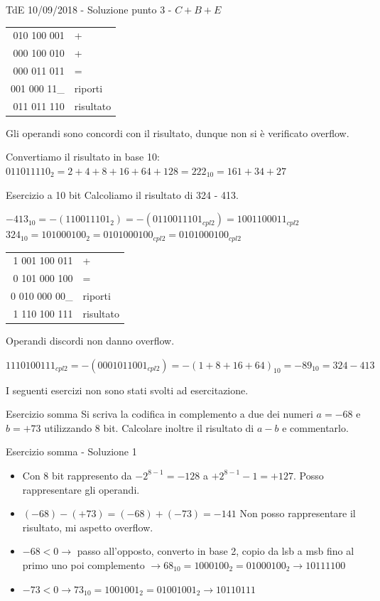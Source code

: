 \documentclass[aspectratio=169, ]{beamer}
\begin{document}
\begin{frame}{TdE 10/09/2018 - Soluzione punto 3 - $C+B+E$}
\begin{tabular}{r|l}
	010 100 001 & + \\
	000 100 010 & + \\
	000 011 011 &	=	\\
	\hline
	001 000 11\_&	riporti\\
	011 011 110	& risultato
\end{tabular}

\pause
Gli operandi sono concordi con il risultato, dunque non si è verificato overflow.

\pause
Convertiamo il risultato in base 10: $011011110_2 = 2+4+8+16+64+128 = 222_{10} = 161+34+27$
\end{frame}

\begin{frame}{Esercizio a 10 bit}
Calcoliamo il risultato di 324 - 413.

\pause
$-413_{10} = -(110011101_2) = -(0110011101_{cpl2}) = 1001100011_{cpl2}$\\
$324_{10} = 101000100_2 = 0101000100_{cpl2}        = 0101000100_{cpl2}$

\pause
\begin{tabular}{r|l}
	1 001 100 011 & + \\
	0 101 000 100 & = \\
	\hline
	0 010 000 00\_&	riporti\\
    1 110 100 111 & risultato
\end{tabular}

\pause
Operandi discordi non danno overflow.

\pause
$1110100111_{cpl2} = -(0001011001_{cpl2}) = -(1+8+16+64)_{10} = -89_{10} = 324-413$
\end{frame}

\begin{frame}
I seguenti esercizi non sono stati svolti ad esercitazione.
\end{frame}


\begin{frame}{Esercizio somma}
Si scriva la codifica in complemento a due dei numeri $a=-68$ e $b=+73$ utilizzando 8 bit.
Calcolare inoltre il risultato di $a-b$ e commentarlo.
\end{frame}

\begin{frame}{Esercizio somma - Soluzione 1}
\begin{itemize}[<+->]
\item Con 8 bit rappresento da $-2^{8-1} = -128$ a $+2^{8-1}-1 = +127$. Posso rappresentare gli operandi.
\item $(-68) - (+73) = (-68) + (-73) = -141$ Non posso rappresentare il risultato, mi aspetto overflow.
\item $-68 < 0 \rightarrow$ passo all'opposto, converto in base 2, copio da lsb a msb fino al primo uno poi complemento $\rightarrow 68_{10} = 1000100_2 = 01000100_2 \rightarrow 10111100$
\item $-73 < 0 \rightarrow 73_{10} = 1001001_2 = 01001001_2 \rightarrow 10110111$
\end{itemize}
\end{frame}
\end{document}
